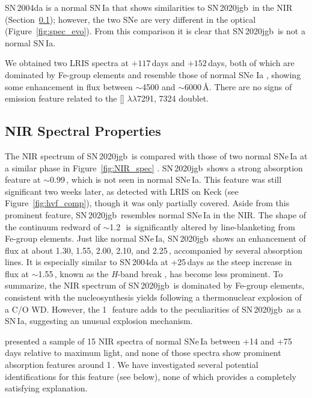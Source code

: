 \documentclass[twocolumn]{aastex631}
\newcommand{\sn}{SN\,2020jgb}
\begin{document}
SN\,2004da is a normal SN\,Ia that shows similarities to \sn\ in the NIR (Section~\ref{sec:NIR_spec}); however, the two SNe are very different in the optical (Figure~\ref{fig:spec_evo}). From this comparison it is clear that \sn\ is not a normal SN\,Ia. 

We obtained two LRIS spectra at $+117$\,days and $+152$\,days, both of which are dominated by Fe-group elements and resemble those of normal SNe Ia \citep[e.g., SN\,2011fe;][]{Mazzali_2015}, showing some enhancement in flux between $\sim$4500 and $\sim$6000\,\AA. There are no signs of emission feature related to the [] $\lambda\lambda$7291, 7324 doublet.

\subsection{NIR Spectral Properties}
\label{sec:NIR_spec}
The NIR spectrum of \sn\ is compared with those of two normal SNe\,Ia at a similar phase in Figure~\ref{fig:NIR_spec} \citep[data for SN\,2004ab and SN\,2004da from][]{Marion2009_NIR}. \sn\ shows a strong absorption feature at $\sim$0.99\,\micron, which is not seen in normal SNe\,Ia. This feature was still significant two weeks later, as detected with LRIS on Keck (see Figure~\ref{fig:hvf_comp}), though it was only partially covered. Aside from this prominent feature, \sn\ resembles normal SNe\,Ia in the NIR. The shape of the continuum redward of $\sim$1.2\,\micron\ is significantly altered by line-blanketing from Fe-group elements. Just like normal SNe\,Ia, \sn\ shows an enhancement of flux at about 1.30, 1.55, 2.00, 2.10, and 2.25\,\micron, accompanied by several  absorption lines. It is especially similar to SN\,2004da at +25\,days as the steep increase in flux at $\sim$1.55\,\micron, known as the \textit{H}-band break \citep{Hsiao_CSP_2019}, has become less prominent. To summarize, the NIR spectrum of \sn\ is dominated by Fe-group elements, consistent with the nucleosynthesis yields following a thermonuclear explosion of a C/O WD. However, the  1\,\micron\ feature adds to the peculiarities of \sn\ as a SN\,Ia, suggesting an unusual explosion mechanism.

\citet{Marion2009_NIR} presented a sample of 15 NIR spectra of normal SNe\,Ia between +14 and +75\,days relative to maximum light, and none of those spectra show prominent absorption features around 1\,\micron. We have investigated several potential identifications for this feature (see below), none of which provides a completely satisfying explanation.
\end{document}
